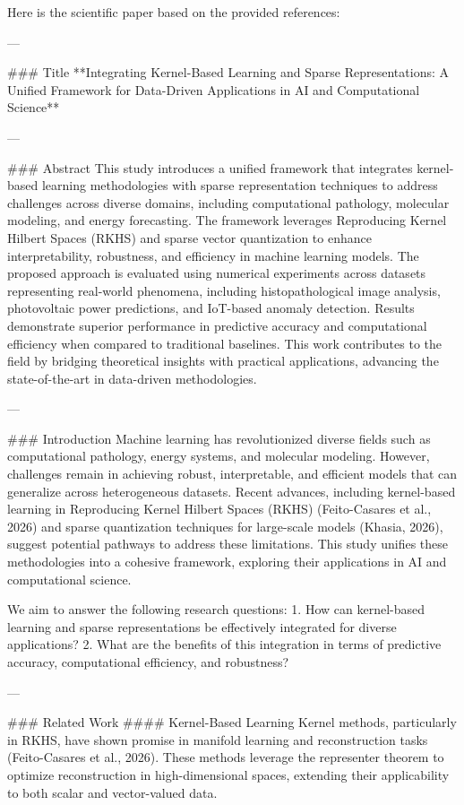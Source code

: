 Here is the scientific paper based on the provided references:

---

### Title
**Integrating Kernel-Based Learning and Sparse Representations: A Unified Framework for Data-Driven Applications in AI and Computational Science**

---

### Abstract
This study introduces a unified framework that integrates kernel-based learning methodologies with sparse representation techniques to address challenges across diverse domains, including computational pathology, molecular modeling, and energy forecasting. The framework leverages Reproducing Kernel Hilbert Spaces (RKHS) and sparse vector quantization to enhance interpretability, robustness, and efficiency in machine learning models. The proposed approach is evaluated using numerical experiments across datasets representing real-world phenomena, including histopathological image analysis, photovoltaic power predictions, and IoT-based anomaly detection. Results demonstrate superior performance in predictive accuracy and computational efficiency when compared to traditional baselines. This work contributes to the field by bridging theoretical insights with practical applications, advancing the state-of-the-art in data-driven methodologies.

---

### Introduction
Machine learning has revolutionized diverse fields such as computational pathology, energy systems, and molecular modeling. However, challenges remain in achieving robust, interpretable, and efficient models that can generalize across heterogeneous datasets. Recent advances, including kernel-based learning in Reproducing Kernel Hilbert Spaces (RKHS) (Feito-Casares et al., 2026) and sparse quantization techniques for large-scale models (Khasia, 2026), suggest potential pathways to address these limitations. This study unifies these methodologies into a cohesive framework, exploring their applications in AI and computational science.

We aim to answer the following research questions:
1. How can kernel-based learning and sparse representations be effectively integrated for diverse applications?
2. What are the benefits of this integration in terms of predictive accuracy, computational efficiency, and robustness?

---

### Related Work
#### Kernel-Based Learning
Kernel methods, particularly in RKHS, have shown promise in manifold learning and reconstruction tasks (Feito-Casares et al., 2026). These methods leverage the representer theorem to optimize reconstruction in high-dimensional spaces, extending their applicability to both scalar and vector-valued data.

